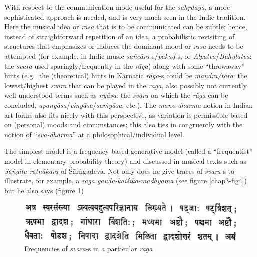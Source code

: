 With respect to the communication mode useful for the \textsl{sahṛdaya}, a more sophisticated approach is needed, and is very much seen in the Indic tradition. Here the musical idea or \textsl{rasa} that is to be communicated can be subtle; hence, instead of straightforward repetition of an idea, a probabilistic revisiting of structures that emphasizes or induces the dominant mood or \textsl{rasa} needs to be attempted (for example, in Indic music \textsl{sañcāra}-s/\textsl{pakaḍ}-s, or \textsl{Alpatva}/\textsl{Bahulatva}: the \textsl{svara} used sparingly/frequently in the \textsl{rāga}) along with some “throwaway” hints (e.g., the (theoretical) hints in Karnatic \textsl{rāga}-s could be \textsl{mandra/tāra}: the lowest/highest \textsl{svara} that can be played in the \textsl{rāga}, also possibly not currently well understood terms such as \textsl{nyāsa}: the \textsl{svara} on which the \textsl{rāga} can be concluded, \textsl{apanyāsa}/\textsl{vinyāsa}/\textsl{saṁyāsa}, etc.). The \textsl{mano-dharma} notion in Indian art forms also fits nicely with this perspective, as variation is permissible based on (personal) moods and circumstances; this also ties in congruently with the notion of “\textsl{sva-dharma}” at a philosophical/individual level.
\vskip 2pt

The simplest model is a frequency based generative model (called a “frequentist” model in elementary probability theory) and discussed in musical texts such as \textsl{Saṅgīta-ratnākara} of Śārṅgadeva. Not only does he give traces of \textsl{svara}-s to illustrate, for example, a \textsl{rāga gauḍa-kaiśika-madhyama} (see figure \ref{chap3-fig4}) but he also says (figure \ref{chap3-fig3})
\begin{figure}[tph]
\centering
\includegraphics[scale=.35]{figures/5.eps}
\caption{Frequencies of \textsl{svara}-s in a particular \textsl{rāga}}\label{chap3-fig3}
\end{figure}

